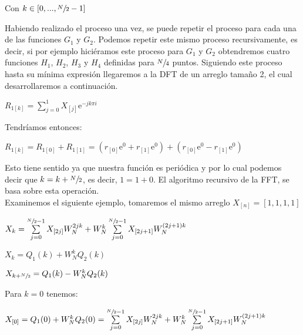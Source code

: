 \documentclass[a4paper]{article}
\begin{document}
\begin{center}
Con $k \in [0,...,\sfrac{N}{2} - 1]$
\end{center}

Habiendo realizado el proceso una vez, se puede repetir el proceso para cada una de las funciones $G_{1}$ y $G_{2}$. Podemos repetir este mismo proceso recursivamente, es decir, si por ejemplo hiciéramos este proceso para $G_{1}$ y $G_{2}$ obtendremos cuatro funciones $H_{1}$, $H_{2}$, $H_{3}$ y $H_{4}$ definidas para $\sfrac{N}{4}$ puntos. Siguiendo este proceso hasta su mínima expresión llegaremos a la DFT de un arreglo tamaño 2, el cual desarrollaremos a continuación.

\begin{center}
$R_{1[k]} = \sum \limits_{j=0}^{1} X_{[j]} \mathrm{e}^{-jk\pi i}$
\end{center}

Tendríamos entonces:

\begin{center}
$R_{1[k]} = R_{1[0]} + R_{1[1]} = (r_{[0]} \mathrm{e}^{0} + r_{[1]} \mathrm{e}^{0}) + (r_{[0]} \mathrm{e}^{0} - r_{[1]} \mathrm{e}^{0})$
\end{center}

Esto tiene sentido ya que nuestra función es periódica y por lo cual podemos decir que $k = k + \sfrac{N}{2}$, es decir, $1 = 1 + 0$. El algoritmo recursivo de la FFT, se basa sobre esta operación.\\

Examinemos el siguiente ejemplo, tomaremos el mismo arreglo $X_{[n]} = [1,1,1,1]$

\begin{center}
$ X_{k} = \sum \limits_{j=0}^{\sfrac{N}{2} - 1} X_{[2j]} W_{N}^{2jk} + W_{N}^{k} \sum \limits_{j=0}^{\sfrac{N}{2} - 1} X_{[2j+1]} W_{N}^{(2j + 1)k}$
\end{center}

\begin{center}
$ X_{k} = Q_{1}(k) + W_{N}^{k} Q_{2}(k)$
\end{center}

\begin{center}
$ X_{k + \sfrac{N}{2}} = Q_{1}(k) - W_{N}^{k} Q_{2}(k)$
\end{center}

Para $k = 0$ tenemos:

\begin{center}
$ X_{[0]} = Q_{1}(0) + W_{N}^{k} Q_{2}(0) = \sum \limits_{j=0}^{\sfrac{N}{2} - 1} X_{[2j]} W_{N}^{2jk} + W_{N}^{k} \sum \limits_{j=0}^{\sfrac{N}{2} - 1} X_{[2j+1]} W_{N}^{(2j + 1)k}$
\end{center}
\end{document}
